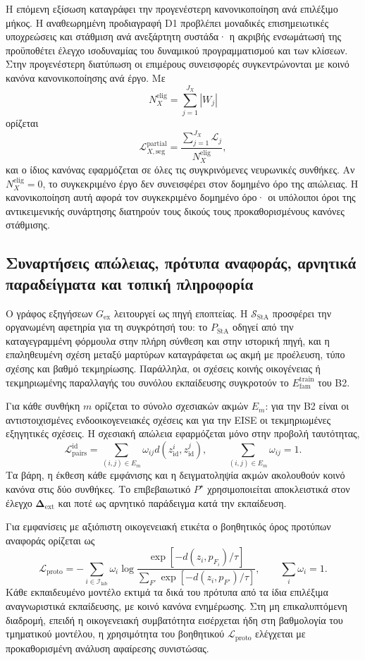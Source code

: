 \documentclass[11pt,a4paper]{article}
\begin{document}
Η επόμενη εξίσωση καταγράφει την προγενέστερη κανονικοποίηση ανά επιλέξιμο μήκος. Η αναθεωρημένη προδιαγραφή D1 προβλέπει μοναδικές επισημειωτικές υποχρεώσεις και στάθμιση ανά ανεξάρτητη συστάδα· η ακριβής ενσωμάτωσή της προϋποθέτει έλεγχο ισοδυναμίας του δυναμικού προγραμματισμού και των κλίσεων. Στην προγενέστερη διατύπωση οι επιμέρους συνεισφορές συγκεντρώνονται με κοινό κανόνα κανονικοποίησης ανά έργο. Με
\[
N_X^{\mathrm{elig}}=\sum_{j=1}^{J_X}|W_j|
\]
ορίζεται
\[
\mathcal L_{X,\mathrm{seg}}^{\mathrm{partial}}
=
\frac{\displaystyle\sum_{j=1}^{J_X}\mathcal L_j}
{N_X^{\mathrm{elig}}},
\]
και ο ίδιος κανόνας εφαρμόζεται σε όλες τις συγκρινόμενες νευρωνικές συνθήκες. Αν $N_X^{\mathrm{elig}}=0$, το συγκεκριμένο έργο δεν συνεισφέρει στον δομημένο όρο της απώλειας. Η κανονικοποίηση αυτή αφορά τον συγκεκριμένο δομημένο όρο· οι υπόλοιποι όροι της αντικειμενικής συνάρτησης διατηρούν τους δικούς τους προκαθορισμένους κανόνες στάθμισης.

\subsection{Συναρτήσεις απώλειας, πρότυπα αναφοράς, αρνητικά παραδείγματα και τοπική πληροφορία}\label{app:eise-loss}

Ο γράφος εξηγήσεων $G_{\mathrm{ex}}$ λειτουργεί ως πηγή εποπτείας. Η $\mathcal S_{\mathrm{StA}}$ προσφέρει την οργανωμένη αφετηρία για τη συγκρότησή του: το $P_{\mathrm{StA}}$ οδηγεί από την καταγεγραμμένη φόρμουλα στην πλήρη σύνθεση και στην ιστορική πηγή, και η επαληθευμένη σχέση μεταξύ μαρτύρων καταγράφεται ως ακμή με προέλευση, τύπο σχέσης και βαθμό τεκμηρίωσης. Παράλληλα, οι σχέσεις κοινής οικογένειας ή τεκμηριωμένης παραλλαγής του συνόλου εκπαίδευσης συγκροτούν το $E_{\mathrm{fam}}^{\mathrm{train}}$ του B2.

Για κάθε συνθήκη $m$ ορίζεται το σύνολο σχεσιακών ακμών $E_m$: για την B2 είναι οι αντιστοιχισμένες ενδοοικογενειακές σχέσεις και για την EISE οι τεκμηριωμένες εξηγητικές σχέσεις. Η σχεσιακή απώλεια εφαρμόζεται μόνο στην προβολή ταυτότητας,
\[
\mathcal L_{\mathrm{pairs}}^{\mathrm{id}}
=\sum_{(i,j)\in E_m}\omega_{ij}
 d\!\left(z_{\mathrm{id}}^{i},z_{\mathrm{id}}^{j}\right),
\qquad
\sum_{(i,j)\in E_m}\omega_{ij}=1.
\]
Τα βάρη, η έκθεση κάθε εμφάνισης και η δειγματοληψία ακμών ακολουθούν κοινό κανόνα στις δύο συνθήκες. Το επιβεβαιωτικό $P^{\star}$ χρησιμοποιείται αποκλειστικά στον έλεγχο $\boldsymbol{\Delta}_{\mathrm{ext}}$ και ποτέ ως αρνητικό παράδειγμα κατά την εκπαίδευση.

Για εμφανίσεις με αξιόπιστη οικογενειακή ετικέτα ο βοηθητικός όρος προτύπων αναφοράς ορίζεται ως
\[
\mathcal L_{\mathrm{proto}}
=-\sum_{i\in\mathcal I_{\mathrm{lab}}}\omega_i
\log
\frac{\exp[-d(z_i,p_{F_i})/\tau]}
{\sum_{F'}\exp[-d(z_i,p_{F'})/\tau]},
\qquad \sum_i\omega_i=1.
\]
Κάθε εκπαιδευμένο μοντέλο εκτιμά τα δικά του πρότυπα από τα ίδια επιλέξιμα αναγνωριστικά εκπαίδευσης, με κοινό κανόνα ενημέρωσης. Στη μη επικαλυπτόμενη διαδρομή, επειδή η οικογενειακή συμβατότητα εισέρχεται ήδη στη βαθμολογία του τμηματικού μοντέλου, η χρησιμότητα του βοηθητικού $\mathcal L_{\mathrm{proto}}$ ελέγχεται με προκαθορισμένη ανάλυση αφαίρεσης συνιστώσας.
\end{document}
